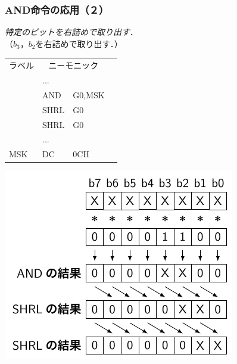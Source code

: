\documentclass{beamer}                 %
\begin{document}
\begin{frame}
  \frametitle{AND命令の応用（２）}
  \emph{特定のビットを右詰めで取り出す．} \\
  （$b_3$，$b_2$を右詰めで取り出す．）\\
  \begin{minipage}{0.48\columnwidth}
    {\small\ttfamily\begin{center}
      \begin{tabular}{|l|l l|l}
        \cline{1-3}
        ラベル & \multicolumn{2}{|c|}{ニーモニック} & \\
        \cline{1-3}
        & ...  &        & \\
        & AND  & G0,MSK & \\
        & SHRL & G0     & \\
        & SHRL & G0     & \\
        & ...  &        & \\
        MSK & DC   & 0CH    & \\
        \cline{1-3}
      \end{tabular}
    \end{center}}
  \end{minipage}
  \begin{minipage}{0.48\columnwidth}
    \centerline{\includegraphics[scale=0.8]{../Tikz/land2.pdf}}
  \end{minipage}
  \vfill
  \vfill
\end{frame}
\end{document}
